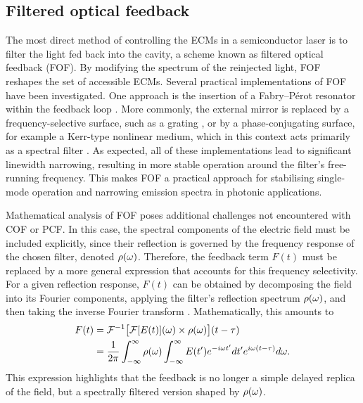 \subsection*{Filtered optical feedback}
\label{subsec:FOF}
%
The most direct method of controlling the ECMs in a semiconductor laser is to filter the light fed back into the cavity, a scheme known as filtered optical feedback (FOF). 
By modifying the spectrum of the reinjected light, FOF reshapes the set of accessible ECMs.
Several practical implementations of FOF have been investigated. One approach is the insertion of a Fabry–Pérot resonator within the feedback loop \cite{detienne1997semiconductor}. More commonly, the external mirror is replaced by a frequency-selective surface, such as a grating \cite{dahmani1987frequency, harvey1991external, jin1996single}, or by a phase-conjugating surface, for example a Kerr-type nonlinear medium, which in this context acts primarily as a spectral filter \cite{agrawal1984line}.
As expected, all of these implementations lead to significant linewidth narrowing, resulting in more stable operation around the filter’s free-running frequency.
This makes FOF a practical approach for stabilising single-mode operation and narrowing emission spectra in photonic applications.
%
\par
%
Mathematical analysis of FOF poses additional challenges not encountered with COF or PCF. 
In this case, the spectral components of the electric field must be included explicitly, since their reflection is governed by the frequency response of the chosen filter, denoted $\rho(\omega)$.
Therefore, the feedback term $F(t)$ must be replaced by a more general expression that accounts for this frequency selectivity.
For a given reflection response, $F(t)$ can be obtained by decomposing the field into its Fourier components, applying the filter’s reflection spectrum $\rho(\omega)$, and then taking the inverse Fourier transform \cite{yousefi1999dynamical}.
Mathematically, this amounts to
%
\begin{equation}
    \begin{aligned}
    \label{eq:FOF}
         F(t) &=  \mathcal{F}^{-1}\big[ \mathcal{F}[E(t)](\omega) \times \rho(\omega) \big](t-\tau)\\
              &= \frac{1}{2\pi} \int_{-\infty}^{\infty} \rho(\omega) \int_{-\infty}^{\infty} E(t') e^{-i \omega t'} dt' e^{i \omega (t-\tau)} d\omega.
    \end{aligned}
\end{equation}
%
This expression highlights that the feedback is no longer a simple delayed replica of the field, but a spectrally filtered version shaped by $\rho(\omega)$.
